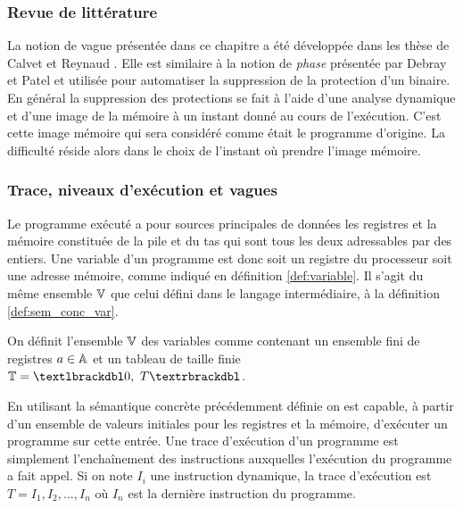 \subsubsection{Revue de littérature}
La notion de vague présentée dans ce chapitre a été développée dans les thèse de Calvet \cite{Calvet2013} et Reynaud \cite{Reynaud2010}.
Elle est similaire à la notion de \emph{phase} présentée par Debray et Patel \cite{DP10} et utilisée pour automatiser la suppression de la protection d'un binaire.
En général la suppression des protections se fait à l'aide d'une analyse dynamique et d'une image de la mémoire à un instant donné au cours de l'exécution. C'est cette image mémoire qui sera considéré comme était le programme d'origine. La difficulté réside alors dans le choix de l'instant où prendre l'image mémoire.


\subsubsection{Trace, niveaux d'exécution et vagues}
Le programme exécuté a pour sources principales de données les registres et la mémoire constituée de la pile et du tas qui sont tous les deux adressables par des entiers. Une variable d'un programme est donc soit un registre du processeur soit une adresse mémoire, comme indiqué en définition \ref{def:variable}. Il s'agit du même ensemble $\mathbb V$ que celui défini dans le langage intermédiaire, à la définition \ref{def:sem_conc_var}.
\begin{defi}
On définit l'ensemble $\mathbb V$ des variables comme contenant un ensemble fini de registres $a\in\mathbb A$ et un tableau de taille finie $\mathbb{T}=\textlbrackdbl 0,\ T\textrbrackdbl$.
\label{def:variable}
\end{defi}

En utilisant la sémantique concrète précédemment définie on est capable, à partir d'un ensemble de valeurs initiales pour les registres et la mémoire, d'exécuter un programme sur cette entrée.
Une trace d'exécution d'un programme est simplement l'enchaînement des instructions auxquelles l'exécution du programme a fait appel. Si on note $I_i$ une instruction dynamique, la trace d'exécution est $T=I_1, I_2, ..., I_n$ où $I_n$ est la dernière instruction du programme.

